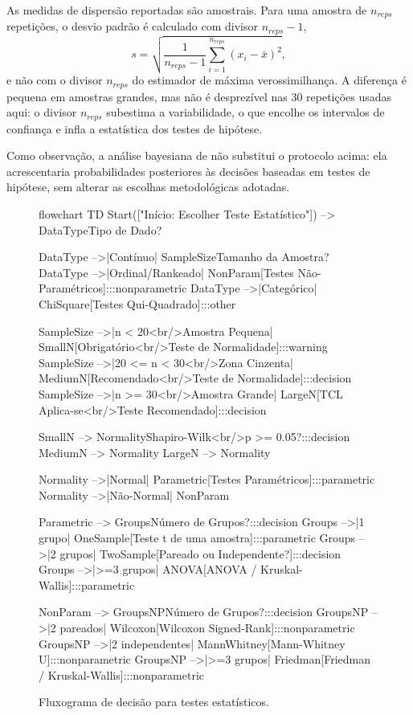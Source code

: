 As medidas de dispersão reportadas são amostrais.
Para uma amostra de \(n_{reps}\) repetições, o desvio padrão é calculado com divisor \(n_{reps} - 1\),
\[
  s = \sqrt{\frac{1}{n_{reps} - 1} \sum_{i=1}^{n_{reps}} \left(x_i - \bar{x}\right)^2},
\]
e não com o divisor \(n_{reps}\) do estimador de máxima verossimilhança.
A diferença é pequena em amostras grandes, mas não é desprezível nas 30 repetições usadas aqui: o divisor \(n_{reps}\) subestima a variabilidade, o que encolhe os intervalos de confiança e infla a estatística dos testes de hipótese.

Como observação, a análise bayesiana de \textcite{benavoli2017time} não substitui o protocolo acima: ela acrescentaria probabilidades posteriores às decisões baseadas em testes de hipótese, sem alterar as escolhas metodológicas adotadas.

\begin{figure}[htbp]
  \centering
  \begin{mermaid}
    flowchart TD
    Start(["Início: Escolher Teste Estatístico"]) --> DataType{Tipo de Dado?}

    DataType -->|Contínuo| SampleSize{Tamanho da Amostra?}
    DataType -->|Ordinal/Rankeado| NonParam[Testes Não-Paramétricos]:::nonparametric
    DataType -->|Categórico| ChiSquare[Testes Qui-Quadrado]:::other

    SampleSize -->|n < 20<br/>Amostra Pequena| SmallN[Obrigatório<br/>Teste de Normalidade]:::warning
    SampleSize -->|20 <= n < 30<br/>Zona Cinzenta| MediumN[Recomendado<br/>Teste de Normalidade]:::decision
    SampleSize -->|n >= 30<br/>Amostra Grande| LargeN[TCL Aplica-se<br/>Teste Recomendado]:::decision

    SmallN --> Normality{Shapiro-Wilk<br/>p >= 0.05?}:::decision
    MediumN --> Normality
    LargeN --> Normality

    Normality -->|Normal| Parametric[Testes Paramétricos]:::parametric
    Normality -->|Não-Normal| NonParam

    Parametric --> Groups{Número de Grupos?}:::decision
    Groups -->|1 grupo| OneSample[Teste t de uma amostra]:::parametric
    Groups -->|2 grupos| TwoSample[Pareado ou Independente?]:::decision
    Groups -->|>=3 grupos| ANOVA[ANOVA / Kruskal-Wallis]:::parametric

    NonParam --> GroupsNP{Número de Grupos?}:::decision
    GroupsNP -->|2 pareados| Wilcoxon[Wilcoxon Signed-Rank]:::nonparametric
    GroupsNP -->|2 independentes| MannWhitney[Mann-Whitney U]:::nonparametric
    GroupsNP -->|>=3 grupos| Friedman[Friedman / Kruskal-Wallis]:::nonparametric
  \end{mermaid}
  \caption{Fluxograma de decisão para testes estatísticos.}
  \label{fig:stat-flowchart}
\end{figure}

